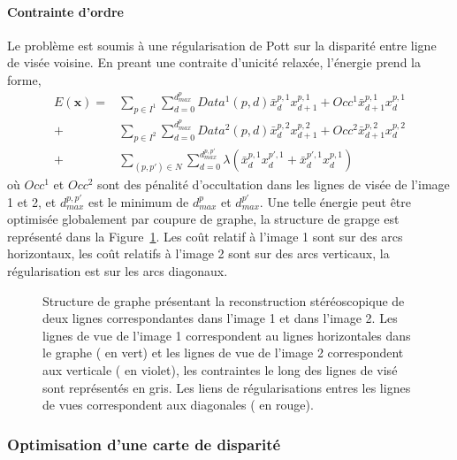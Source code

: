\documentclass[../main/These_Mathias_Paget.tex]{subfiles}
\begin{document}
\paragraph*{Contrainte d'ordre}


Le problème est soumis à une régularisation de Pott sur la disparité entre ligne de visée voisine. En preant une contraite d'unicité relaxée, l’énergie prend la forme,
\begin{equation}
\begin{aligned}
E(\boldsymbol{x}) =& \sum_{ p \in I^1}{ \sum_{d=0}^{d^p_{max}} Data^1(p,d)\bar{x}^{p,1}_{d}x^{p,1}_{d+1} + Occ^1\bar{x}^{p,1}_{d+1}x^{p,1}_{d} } \\
+& \sum_{ p \in I^2}{ \sum_{d=0}^{d^p_{max}} Data^2(p,d)\bar{x}^{p,2}_{d}x^{p,2}_{d+1} + Occ^2\bar{x}^{p,2}_{d+1}x^{p,2}_{d} } \\
+& \sum_{ (p,p') \in N} \sum_{d=0}^{d_{max}^{p,p'}}{\lambda (\bar{x}^{p,1}_dx^{p',1}_d + \bar{x}^{p',1}_dx^{p,1}_d )   }
\end{aligned}
\end{equation}
où $Occ^1$ et $Occ^2$ sont des pénalité d'occultation dans les lignes de visée de l'image 1 et 2, et $d_{max}^{p,p'}$ est le minimum de $d_{max}^{p}$ et $d_{max}^{p'}$. Une telle énergie peut être optimisée globalement par coupure de graphe, la structure de grapge est représenté dans la Figure~\ref{fig:uvd_graph}. Les coût relatif à l'image 1 sont sur des arcs horizontaux, les coût relatifs à l'image 2 sont sur des arcs verticaux, la régularisation est sur les arcs diagonaux.

\begin{figure}
\centering

\caption{Structure de graphe présentant la reconstruction stéréoscopique de deux lignes correspondantes dans l’image 1 et dans l'image 2. Les lignes de vue de l'image 1 correspondent au lignes horizontales dans le graphe (\color{teal} en vert\color{black}) et les lignes de vue de l’image 2 correspondent aux verticale (\color{violet} en violet\color{black}), les contraintes le long des lignes de visé sont représentés \color{gray} en gris\color{black}. Les liens de régularisations entres les lignes de vues correspondent aux diagonales (\color{red} en rouge\color{black}).}
\label{fig:uvd_graph}
\end{figure}

\subsubsection{Optimisation d'une carte de disparité}
\end{document}
